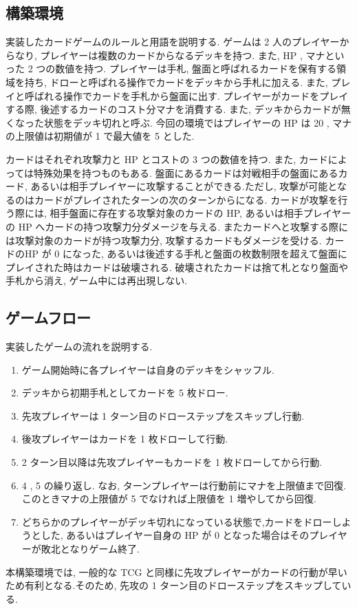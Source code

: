 \documentclass[twocolumn]{jarticle}
\begin{document}
\subsection{構築環境}
実装したカードゲームのルールと用語を説明する.
ゲームは 2 人のプレイヤーからなり, プレイヤーは複数のカードからなるデッキを持つ. また, HP , マナといった 2 つの数値を持つ. 
プレイヤーは手札, 盤面と呼ばれるカードを保有する領域を持ち, ドローと呼ばれる操作でカードをデッキから手札に加える. また, プレイと呼ばれる操作でカードを手札から盤面に出す. プレイヤーがカードをプレイする際, 後述するカードのコスト分マナを消費する. また, デッキからカードが無くなった状態をデッキ切れと呼ぶ.  
今回の環境ではプレイヤーの HP は 20 , マナの上限値は初期値が 1 で最大値を 5 とした.
\par
カードはそれぞれ攻撃力と HP とコストの 3 つの数値を持つ. また, カードによっては特殊効果を持つものもある. 盤面にあるカードは対戦相手の盤面にあるカード, あるいは相手プレイヤーに攻撃することができる.ただし, 攻撃が可能となるのはカードがプレイされたターンの次のターンからになる. カードが攻撃を行う際には, 相手盤面に存在する攻撃対象のカードの HP, あるいは相手プレイヤーの HP へカードの持つ攻撃力分ダメージを与える. またカードへと攻撃する際には攻撃対象のカードが持つ攻撃力分, 攻撃するカードもダメージを受ける.
カードのHP が 0 になった, あるいは後述する手札と盤面の枚数制限を超えて盤面にプレイされた時はカードは破壊される. 破壊されたカードは捨て札となり盤面や手札から消え, ゲーム中には再出現しない. 
\subsection{ゲームフロー}
実装したゲームの流れを説明する.
\begin{enumerate}
  \small
  \setlength{\itemsep}{0cm} %
  \item ゲーム開始時に各プレイヤーは自身のデッキをシャッフル.
  \item デッキから初期手札としてカードを 5 枚ドロー. 
  \item 先攻プレイヤーは 1 ターン目のドローステップをスキップし行動.
  \item 後攻プレイヤーはカードを 1 枚ドローして行動.
  \item 2 ターン目以降は先攻プレイヤーもカードを 1 枚ドローしてから行動. 
  \item 4 , 5 の繰り返し. なお, ターンプレイヤーは行動前にマナを上限値まで回復. このときマナの上限値が 5 でなければ上限値を 1 増やしてから回復.
  \item どちらかのプレイヤーがデッキ切れになっている状態で,カードをドローしようとした, あるいはプレイヤー自身の HP が 0 となった場合はそのプレイヤーが敗北となりゲーム終了.
\end{enumerate}
\par
本構築環境では, 一般的な TCG と同様に先攻プレイヤーがカードの行動が早いため有利となる.そのため, 先攻の 1 ターン目のドローステップをスキップしている. 
\end{document}

